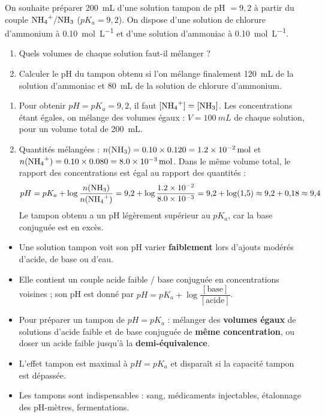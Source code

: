 \documentclass[11pt]{article}
\newcommand{\cle}[1]{{\popxbold\color{popdark}#1}}
\begin{document}
\begin{exercice}
On souhaite préparer \SI{200}{mL} d'une solution tampon de pH $= 9{,}2$ à partir du couple $\ce{NH4+}/\ce{NH3}$ ($pK_a = 9{,}2$). On dispose d'une solution de chlorure d'ammonium  à \SI{0,10}{mol.L^{-1}} et d'une solution d'ammoniac  à \SI{0,10}{mol.L^{-1}}.
\begin{enumerate}
\item Quels volumes de chaque solution faut-il mélanger ?
\item Calculer le pH du tampon obtenu si l'on mélange finalement \SI{120}{mL} de la solution d'ammoniac et \SI{80}{mL} de la solution de chlorure d'ammonium.
\end{enumerate}
\end{exercice}

\begin{corrige}[Exercice]
\begin{enumerate}
\item Pour obtenir $pH = pK_a = 9{,}2$, il faut $[\ce{NH4+}] = [\ce{NH3}]$. Les concentrations étant égales, on mélange des volumes égaux : $V = \SI{100}{mL}$ de chaque solution, pour un volume total de \SI{200}{mL}.
\item Quantités mélangées : $n(\ce{NH3}) = \num{0,10} \times \num{0,120} = \SI{1,2e-2}{mol}$ et $n(\ce{NH4+}) = \num{0,10} \times \num{0,080} = \SI{8,0e-3}{mol}$. Dans le même volume total, le rapport des concentrations est égal au rapport des quantités :
\[ pH = pK_a + \log\frac{n(\ce{NH3})}{n(\ce{NH4+})} = 9{,}2 + \log\frac{\num{1,2e-2}}{\num{8,0e-3}} = 9{,}2 + \log(1{,}5) \approx 9{,}2 + 0{,}18 \approx 9{,}4 \]
Le tampon obtenu a un pH légèrement supérieur au $pK_a$, car la base conjuguée est en excès.
\end{enumerate}
\end{corrige}

\begin{aretenir}
\begin{itemize}
\item Une \cle{solution tampon} voit son pH varier \textbf{faiblement} lors d'ajouts modérés d'acide, de base ou d'eau.
\item Elle contient un couple acide faible / base conjuguée en concentrations voisines ; son pH est donné par $pH = pK_a + \log\dfrac{[\text{base}]}{[\text{acide}]}$.
\item Pour préparer un tampon de $pH = pK_a$ : mélanger des \textbf{volumes égaux} de solutions d'acide faible et de base conjuguée de \textbf{même concentration}, ou doser un acide faible jusqu'à la \textbf{demi-équivalence}.
\item L'effet tampon est maximal à $pH = pK_a$ et disparaît si la capacité tampon est dépassée.
\item Les tampons sont indispensables : sang, médicaments injectables, étalonnage des pH-mètres, fermentations.
\end{itemize}
\end{aretenir}
\end{document}
